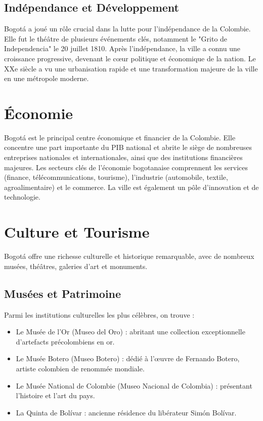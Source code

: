 \documentclass{article}
\begin{document}
\subsection{Indépendance et Développement}
Bogotá a joué un rôle crucial dans la lutte pour l'indépendance de la Colombie. Elle fut le théâtre de plusieurs événements clés, notamment le "Grito de Independencia" le 20 juillet 1810. Après l'indépendance, la ville a connu une croissance progressive, devenant le cœur politique et économique de la nation. Le XXe siècle a vu une urbanisation rapide et une transformation majeure de la ville en une métropole moderne.

\section{Économie}
Bogotá est le principal centre économique et financier de la Colombie. Elle concentre une part importante du PIB national et abrite le siège de nombreuses entreprises nationales et internationales, ainsi que des institutions financières majeures. Les secteurs clés de l'économie bogotanaise comprennent les services (finance, télécommunications, tourisme), l'industrie (automobile, textile, agroalimentaire) et le commerce. La ville est également un pôle d'innovation et de technologie.

\section{Culture et Tourisme}
Bogotá offre une richesse culturelle et historique remarquable, avec de nombreux musées, théâtres, galeries d'art et monuments.

\subsection{Musées et Patrimoine}
Parmi les institutions culturelles les plus célèbres, on trouve :
\begin{itemize}
    \item Le Musée de l'Or (Museo del Oro) : abritant une collection exceptionnelle d'artefacts précolombiens en or.
    \item Le Musée Botero (Museo Botero) : dédié à l'œuvre de Fernando Botero, artiste colombien de renommée mondiale.
    \item Le Musée National de Colombie (Museo Nacional de Colombia) : présentant l'histoire et l'art du pays.
    \item La Quinta de Bolívar : ancienne résidence du libérateur Simón Bolívar.
\end{itemize}
\end{document}
